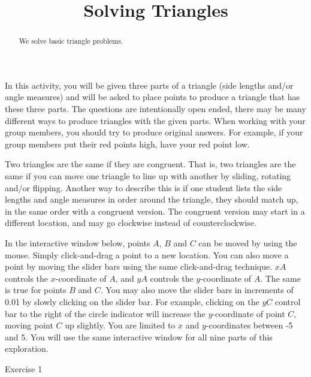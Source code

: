 \documentclass{ximera}
\title{Solving Triangles}
\begin{document}
\begin{abstract}
  We solve basic triangle problems.
\end{abstract}
\maketitle

In this activity, you will be given three parts of a triangle (side lengths and/or angle measures) and will be asked to place points to produce a triangle that has these three parts. The questions are intentionally open ended, there may be many different ways to produce triangles with the given parts. When working with your group members, you should try to produce original answers. For example, if your group members put their red points high, have your red point low.

\bigskip

Two triangles are the same if they are congruent. That is, two triangles are the same if you can move one triangle to line up with another by sliding, rotating and/or flipping. Another way to describe this is if one student lists the side lengths and angle measures in order around the triangle, they should match up, in the same order with a congruent version. The congruent version may start in a different location, and may go clockwise instead of counterclockwise.

In the interactive window below, points $A$, $B$ and $C$ can be moved by using the mouse. Simply click-and-drag a point to a new location. You can also move a point by moving the slider bars using the same click-and-drag technique. $xA$ controls the $x$-coordinate of $A$, and $yA$ controls the $y$-coordinate of $A$. The same is true for points $B$ and $C$. You may also move the slider bars in increments of 0.01 by slowly clicking on the slider bar. For example, clicking on the $yC$ control bar to the right of the circle indicator will increase the $y$-coordinate of point $C$, moving point $C$ up slightly. You are limited to $x$ and $y$-coordinates between -5 and 5. You will use the same interactive window for all nine parts of this exploration.

\ifdefined\HCode
{}
\fi

Exercise 1
\end{document}
